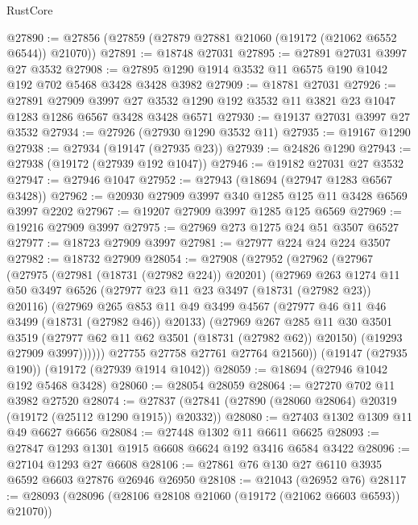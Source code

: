 \begin{lexlean}{RustCore}
\begin{coremodule}
@27890 := @27856 (@27859 (@27879 @27881 @21060 (@19172 (@21062 @6552 @6544)) @21070))
@27891 := @18748 @27031
@27895 := @27891 @27031 @3997 @27 @3532
@27908 := @27895 @1290 @1914 @3532 @11 @6575 @190 @1042 @192 @702 @5468 @3428 @3428 @3982
@27909 := @18781 @27031
@27926 := @27891
    @27909
    @3997
    @27
    @3532
    @1290
    @192
    @3532
    @11
    @3821
    @23
    @1047
    @1283
    @1286
    @6567
    @3428
    @3428
    @6571
@27930 := @19137 @27031 @3997 @27 @3532
@27934 := @27926 (@27930 @1290 @3532 @11)
@27935 := @19167 @1290
@27938 := @27934 (@19147 (@27935 @23))
@27939 := @24826 @1290
@27943 := @27938 (@19172 (@27939 @192 @1047))
@27946 := @19182 @27031 @27 @3532
@27947 := @27946 @1047
@27952 := @27943 (@18694 (@27947 @1283 @6567 @3428))
@27962 := @20930 @27909 @3997 @340 @1285 @125 @11 @3428 @6569 @3997 @2202
@27967 := @19207 @27909 @3997 @1285 @125 @6569
@27969 := @19216 @27909 @3997
@27975 := @27969 @273 @1275 @24 @51 @3507 @6527
@27977 := @18723 @27909 @3997
@27981 := @27977 @224 @24 @224 @3507
@27982 := @18732 @27909
@28054 := @27908
    (@27952
      (@27962
        (@27967
          (@27975
            (@27981 (@18731 (@27982 @224)) @20201)
            (@27969
              @263
              @1274
              @11
              @50
              @3497
              @6526
              (@27977 @23 @11 @23 @3497 (@18731 (@27982 @23)) @20116)
              (@27969
                @265
                @853
                @11
                @49
                @3499
                @4567
                (@27977 @46 @11 @46 @3499 (@18731 (@27982 @46)) @20133)
                (@27969
                  @267
                  @285
                  @11
                  @30
                  @3501
                  @3519
                  (@27977 @62 @11 @62 @3501 (@18731 (@27982 @62)) @20150)
                  (@19293 @27909 @3997))))))
        @27755
        @27758
        @27761
        @27764
        @21560))
    (@19147 (@27935 @190))
    (@19172 (@27939 @1914 @1042))
@28059 := @18694 (@27946 @1042 @192 @5468 @3428)
@28060 := @28054 @28059
@28064 := @27270 @702 @11 @3982 @27520
@28074 := @27837 (@27841 (@27890 (@28060 @28064) @20319 (@19172 (@25112 @1290 @1915)) @20332))
@28080 := @27403 @1302 @1309 @11 @49 @6627 @6656
@28084 := @27448 @1302 @11 @6611 @6625
@28093 := @27847 @1293 @1301 @1915 @6608 @6624 @192 @3416 @6584 @3422
@28096 := @27104 @1293 @27 @6608
@28106 := @27861 @76 @130 @27 @6110 @3935 @6592 @6603 @27876 @26946 @26950
@28108 := @21043 (@26952 @76)
@28117 := @28093 (@28096 (@28106 @28108 @21060 (@19172 (@21062 @6603 @6593)) @21070))

\end{coremodule}
\end{lexlean}
